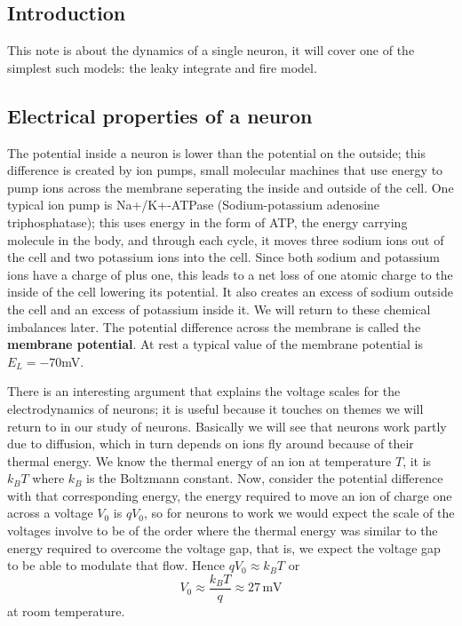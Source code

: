 \documentclass[11pt,a4paper]{scrartcl}
\begin{document}
\subsection*{Introduction}
This note is about the dynamics of a single neuron, it will cover
one of the simplest such models: the leaky integrate and fire model.

\subsection*{Electrical properties of a neuron}
The potential inside a neuron is lower than the potential on the
outside; this difference is created by ion pumps, small molecular
machines that use energy to pump ions across the membrane seperating
the inside and outside of the cell. One typical ion pump is
Na+/K+-ATPase (Sodium-potassium adenosine triphosphatase); this uses
energy in the form of ATP, the energy carrying molecule in the body,
and through each cycle, it moves three sodium ions out of the cell and
two potassium ions into the cell. Since both sodium and potassium ions
have a charge of plus one, this leads to a net loss of one atomic
charge to the inside of the cell lowering its potential. It also
creates an excess of sodium outside the cell and an excess of
potassium inside it. We will return to these chemical imbalances
later. The potential difference across the membrane is called the
\textbf{membrane potential}. At rest a typical value of the membrane
potential is $E_L=-70 $mV.

There is an interesting argument that explains the voltage scales for
the electrodynamics of neurons; it is useful because it touches on
themes we will return to in our study of neurons. Basically we will
see that neurons work partly due to diffusion, which in turn depends
on ions fly around because of their thermal energy. We know the
thermal energy of an ion at temperature $T$, it is $k_BT$ where $k_B$
is the Boltzmann constant. Now, consider the potential difference with
that corresponding energy, the energy required to move an ion of
charge one across a voltage $V_0$ is $qV_0$, so for neurons to work we
would expect the scale of the voltages involve to be of the order
where the thermal energy was similar to the energy required to
overcome the voltage gap, that is, we expect the voltage gap to be able to modulate that flow. Hence $qV_0\approx k_BT$ or
\begin{equation}
V_0\approx \frac{k_BT}{q}\approx 27\,\mbox{mV}
\end{equation}
at room temperature.
\end{document}
